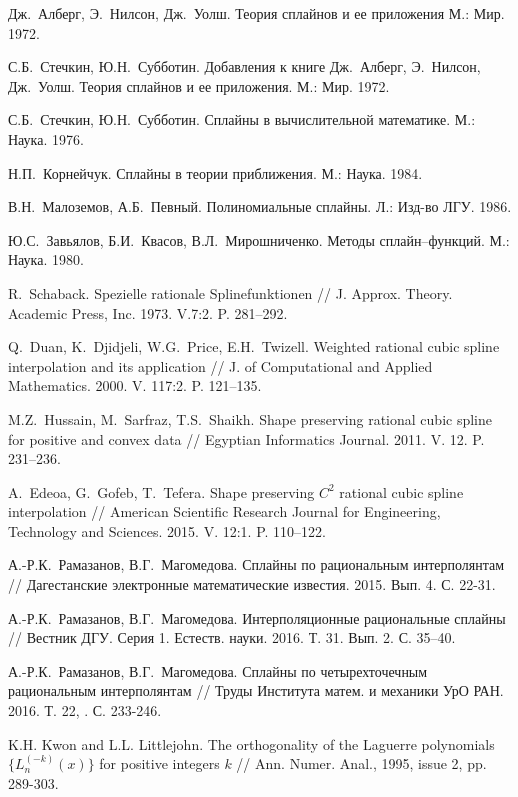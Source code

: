 \begin{thebibliography}{1}
  Дж.~Алберг, Э.~Нилсон, Дж.~Уолш. Теория сплайнов и ее приложения  М.: Мир. 1972.

  С.Б.~Стечкин, Ю.Н.~Субботин. Добавления к книге Дж.~Алберг, Э.~Нилсон, Дж.~Уолш.
 Теория сплайнов и ее приложения.  М.: Мир. 1972.

 С.Б.~Стечкин, Ю.Н.~Субботин.  Сплайны в вычислительной математике. М.:  Наука. 1976.

  Н.П.~Корнейчук.  Сплайны в теории приближения. М.:  Наука. 1984.


  В.Н.~Малоземов, А.Б.~Певный. Полиномиальные сплайны. Л.: Изд-во ЛГУ. 1986.

 Ю.С.~Завьялов, Б.И.~Квасов, В.Л.~Мирошниченко.  Методы сплайн--функций.  М.: Наука. 1980.


 R.~Schaback.  Spezielle rationale Splinefunktionen //  J. Approx. Theory. Academic Press, Inc. 1973. V.7:2.
P. 281--292.

  Q.~Duan, K.~Djidjeli, W.G.~Price, E.H.~Twizell.  Weighted rational  cubic spline interpolation
 and its application // J. of Computational  and Applied Mathematics. 2000. V. 117:2. P. 121--135.

  M.Z.~Hussain, M.~Sarfraz, T.S.~Shaikh.  Shape preserving rational cubic spline for positive
and convex data //  Egyptian Informatics Journal. 2011. V.  12. P. 231--236.

  A.~Edeoa, G.~Gofeb, T.~Tefera.  Shape preserving $C^2$ rational cubic spline interpolation //
 American Scientific Research Journal for Engineering, Technology and Sciences. 2015. V. 12:1. P. 110--122.

 А.-Р.К.~Рамазанов, В.Г.~Магомедова. Сплайны по рациональным интерполянтам // Дагестанские
электронные математические известия. 2015. Вып. 4. С. 22-31.

 А.-Р.К.~Рамазанов, В.Г.~Магомедова. Интерполяционные рациональные сплайны // Вестник ДГУ. Серия 1. Естеств. науки. 2016.
Т. 31. Вып. 2. С. 35--40.

 А.-Р.К.~Рамазанов, В.Г.~Магомедова. Сплайны по четырехточечным рациональным интерполянтам //
Труды Института матем. и механики УрО РАН. 2016. Т. 22, . С. 233-246.

 K.H. Kwon and L.L. Littlejohn. The orthogonality of the Laguerre polynomials $\{L_n^{(-k)}(x)\}$ for positive integers $k$ // Ann. Numer. Anal., 1995, issue 2, pp. 289-303.


\end{thebibliography}
